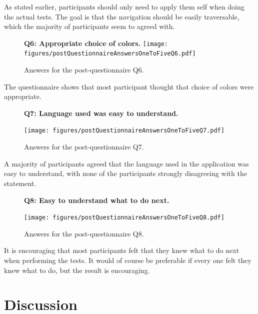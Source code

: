 \documentclass[nofilelist,dvipsnames]{cslthse-msc}
\begin{document}
        As stated earlier, participants should only need to apply them self
        when doing the actual tests. The goal is that the navigation should be
        easily traversable, which the majority of participants seem to agreed with.

				\begin{figure}[h!]
          \begin{center}
            \textbf{Q6: Appropriate choice of colors.}
            \texttt{[image: figures/postQuestionnaireAnswersOneToFiveQ6.pdf]}
            \vspace{-1cm}
            \caption{Answers for the post-questionnaire Q6.}
          \end{center}
				\end{figure}

        The questionnaire shows that most participant thought that choice of
        colors were appropriate.

				\begin{figure}[h!]
          \textbf{Q7: Language used was easy to understand.}
          \begin{center}
            \texttt{[image: figures/postQuestionnaireAnswersOneToFiveQ7.pdf]}
            \vspace{-1cm}
            \caption{Answers for the post-questionnaire Q7.}
          \end{center}
				\end{figure}

        A majority of participants agreed that the language used in the
        application was easy to understand, with none of the participants
        strongly disagreeing with the statement.

				\begin{figure}[h!]
          \textbf{Q8: Easy to understand what to do next.}
          \begin{center}
            \texttt{[image: figures/postQuestionnaireAnswersOneToFiveQ8.pdf]}
            \vspace{-1cm}
            \caption{Answers for the post-questionnaire Q8.}
          \end{center}
				\end{figure}

        It is encouraging that most participants felt that they knew what to do
        next when performing the tests. It would of course be preferable if
        every one felt they knew what to do, but the result is encouraging.

		\section{Discussion}
\end{document}
